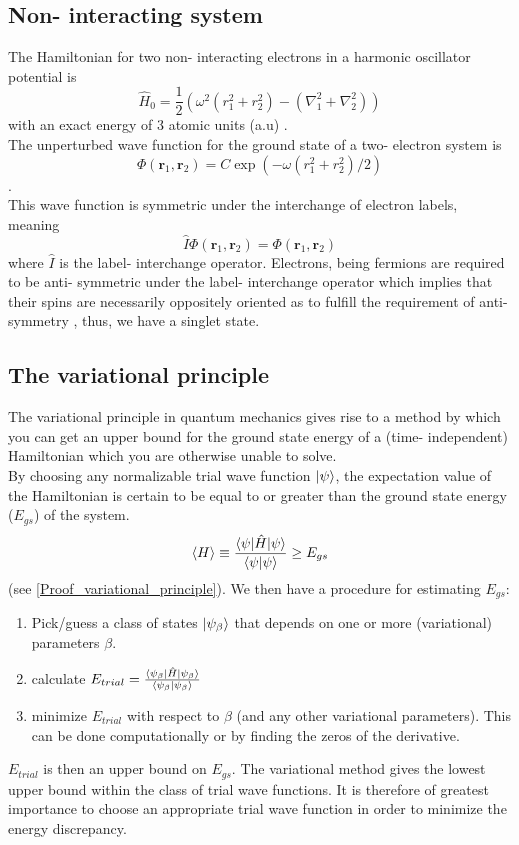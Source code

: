 \documentclass[10pt,a4paper]{article}
\begin{document}
\subsection{Non- interacting system}
The Hamiltonian for two non- interacting electrons in a harmonic oscillator potential is
\begin{equation}
\hat{H}_{0} = \frac{1}{2}\left( \omega^2   \left( r_1^2+r_2^2 \right)-\left( \nabla_1^2 + \nabla_2^2 \right)  \right)
\end{equation}
with an exact energy of 3 atomic units (a.u) \cite{Problem_set_5}.\\The unperturbed wave function for the ground state of a two- electron system is 
\begin{equation*}
\Phi(\mathbf{r}_1,\mathbf{r}_2) = C\exp{\left(-\omega(r_1^2+r_2^2)/2\right)}
\end{equation*}
\cite{Problem_set_5}.\\This wave function is symmetric under the interchange of electron labels, meaning
\begin{equation*}
\hat{I}\Phi(\mathbf{r}_1,\mathbf{r}_2) = \Phi(\mathbf{r}_1,\mathbf{r}_2)
\end{equation*}
where $\hat{I}$ is the label- interchange operator. Electrons, being fermions are required to be anti- symmetric under the label- interchange operator which implies that their spins are necessarily oppositely oriented as to fulfill the requirement of anti- symmetry \cite{griffiths2018introduction}, thus, we have a singlet state.
\subsection{The variational principle}
The variational principle in quantum mechanics gives rise to a method by which you can get an upper bound for the ground state energy of a (time- independent) Hamiltonian which you are otherwise unable to solve.\\ 
By choosing any normalizable trial wave function $\ket{\psi}$, the expectation value of the Hamiltonian is certain to be equal to or greater than the ground state energy ($E_{gs}$) of the system.
$$
\braket{H}\equiv \frac{\braket{\psi|\hat{H}|\psi}}{\braket{\psi|\psi}} \geq E_{gs}
$$
(see \ref{Proof_variational_principle}). We then have a procedure for estimating $E_{gs}$:
\begin{enumerate}
\item Pick/guess a class of states $\ket{\psi_\beta}$ that depends on one or more (variational) parameters $\beta$.
\item calculate $E_{trial}=\frac{\braket{\psi_\beta|\hat{H}|\psi_\beta}}{\braket{\psi_\beta|\psi_\beta}}$
\item minimize $E_{trial}$ with respect to $\beta$ (and any other variational parameters). This can be done computationally or by finding the zeros of the derivative.
\end{enumerate}
$E_{trial}$ is then an upper bound on $E_{gs}$. The variational method gives the lowest upper bound within the class of trial wave functions. It is therefore of greatest importance to choose an appropriate trial wave function in order to minimize the energy discrepancy.
\end{document}
